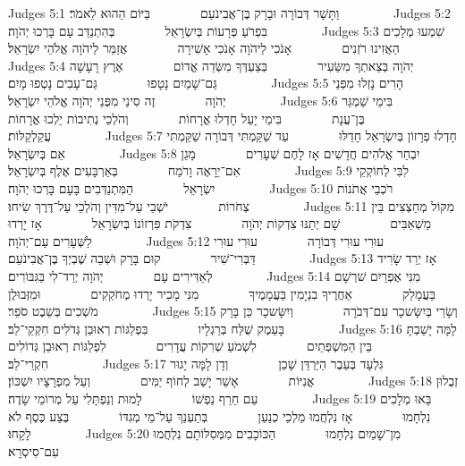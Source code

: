 Judges 5:1	וַתָּשַׁר דְּבוֹרָה וּבָרָק בֶּן־אֲבִינֹעַם        בַּיּוֹם הַהוּא לֵאמֹר׃        
Judges 5:2	בִּפְרֹעַ פְּרָעוֹת בְּיִשְׂרָאֵל        בְּהִתְנַדֵּב עָם בָּרְכוּ יְהֹוָה׃        
Judges 5:3	שִׁמְעוּ מְלָכִים הַאֲזִינוּ רֹזְנִים        אָנֹכִי לַיהֹוָה אָנֹכִי אָשִׁירָה        אֲזַמֵּר לַיהֹוָה אֱלֹהֵי יִשְׂרָאֵל׃        
Judges 5:4	יְהֹוָה בְּצֵאתְךָ מִשֵּׂעִיר        בְּצַעְדְּךָ מִשְּׂדֵה אֱדוֹם        אֶרֶץ רָעָשָׁה גַּם־שָׁמַיִם נָטָפוּ        גַּם־עָבִים נָטְפוּ מָיִם׃        
Judges 5:5	הָרִים נָזְלוּ מִפְּנֵי יְהֹוָה        זֶה סִינַי מִפְּנֵי יְהֹוָה אֱלֹהֵי יִשְׂרָאֵל׃        
Judges 5:6	בִּימֵי שַׁמְגַּר בֶּן־עֲנָת        בִּימֵי יָעֵל חָדְלוּ אֳרָחוֹת        וְהֹלְכֵי נְתִיבוֹת יֵלְכוּ אֳרָחוֹת עֲקַלְקַלּוֹת׃        
Judges 5:7	חָדְלוּ פְרָזוֹן בְּיִשְׂרָאֵל חָדֵלּוּ        עַד שַׁקַּמְתִּי דְּבוֹרָה שַׁקַּמְתִּי אֵם בְּיִשְׂרָאֵל׃        
Judges 5:8	יִבְחַר אֱלֹהִים חֲדָשִׁים אָז לָחֶם שְׁעָרִים        מָגֵן אִם־יֵרָאֶה וָרֹמַח        בְּאַרְבָּעִים אֶלֶף בְּיִשְׂרָאֵל׃        
Judges 5:9	לִבִּי לְחוֹקְקֵי יִשְׂרָאֵל        הַמִּתְנַדְּבִים בָּעָם בָּרְכוּ יְהֹוָה׃        
Judges 5:10	רֹכְבֵי אֲתֹנוֹת צְחֹרוֹת        יֹשְׁבֵי עַל־מִדִּין וְהֹלְכֵי עַל־דֶּרֶךְ שִׂיחוּ׃        
Judges 5:11	מִקּוֹל מְחַצְצִים בֵּין מַשְׁאַבִּים        שָׁם יְתַנּוּ צִדְקוֹת יְהֹוָה        צִדְקֹת פִּרְזוֹנוֹ בְּיִשְׂרָאֵל        אָז יָרְדוּ לַשְּׁעָרִים עַם־יְהֹוָה׃        
Judges 5:12	עוּרִי עוּרִי דְּבוֹרָה        עוּרִי עוּרִי דַּבְּרִי־שִׁיר        קוּם בָּרָק וּשְׁבֵה שֶׁבְיְךָ בֶּן־אֲבִינֹעַם׃        
Judges 5:13	אָז יְרַד שָׂרִיד לְאַדִּירִים עָם        יְהֹוָה יְרַד־לִי בַּגִּבּוֹרִים׃        
Judges 5:14	מִנִּי אֶפְרַיִם שׁרְשָׁם בַּעֲמָלֵק        אַחֲרֶיךָ בִנְיָמִין בַּעֲמָמֶיךָ        מִנִּי מָכִיר יָרְדוּ מְחֹקְקִים        וּמִזְּבוּלֻן מֹשְׁכִים בְּשֵׁבֶט סֹפֵר׃        
Judges 5:15	וְשָׂרַי בְּיִשָּׂשכָר עִם־דְּבֹרָה        וְיִשָּׂשכָר כֵּן בָּרָק בָּעֵמֶק שֻׁלַּח בְּרַגְלָיו        בִּפְלַגּוֹת רְאוּבֵן גְּדֹלִים חִקְקֵי־לֵב׃        
Judges 5:16	לָמָּה יָשַׁבְתָּ בֵּין הַמִּשְׁפְּתַיִם        לִשְׁמֹעַ שְׁרִקוֹת עֲדָרִים        לִפְלַגּוֹת רְאוּבֵן גְּדוֹלִים חִקְרֵי־לֵב׃        
Judges 5:17	גִּלְעָד בְּעֵבֶר הַיַּרְדֵּן שָׁכֵן        וְדָן לָמָּה יָגוּר אֳנִיּוֹת        אָשֵׁר יָשַׁב לְחוֹף יַמִּים        וְעַל מִפְרָצָיו יִשְׁכּוֹן׃        
Judges 5:18	זְבֻלוּן עַם חֵרֵף נַפְשׁוֹ        לָמוּת וְנַפְתָּלִי עַל מְרוֹמֵי שָׂדֶה׃        
Judges 5:19	בָּאוּ מְלָכִים נִלְחָמוּ        אָז נִלְחֲמוּ מַלְכֵי כְנַעַן        בְּתַעְנַךְ עַל־מֵי מְגִדּוֹ        בֶּצַע כֶּסֶף לֹא לָקָחוּ׃        
Judges 5:20	מִן־שָׁמַיִם נִלְחָמוּ        הַכּוֹכָבִים מִמְּסִלּוֹתָם נִלְחֲמוּ עִם־סִיסְרָא׃        
